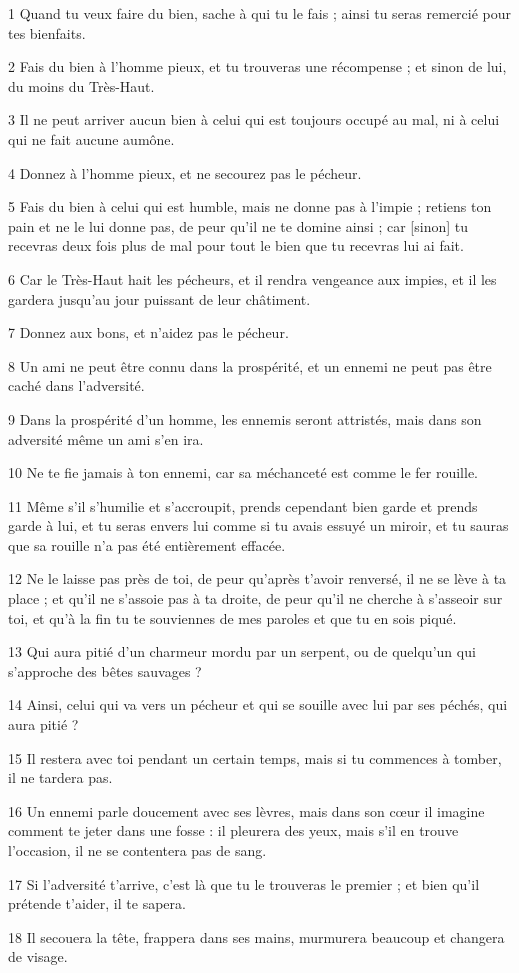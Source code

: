 
\par 1 Quand tu veux faire du bien, sache à qui tu le fais ; ainsi tu seras remercié pour tes bienfaits.
\par 2 Fais du bien à l'homme pieux, et tu trouveras une récompense ; et sinon de lui, du moins du Très-Haut.
\par 3 Il ne peut arriver aucun bien à celui qui est toujours occupé au mal, ni à celui qui ne fait aucune aumône.
\par 4 Donnez à l'homme pieux, et ne secourez pas le pécheur.
\par 5 Fais du bien à celui qui est humble, mais ne donne pas à l'impie ; retiens ton pain et ne le lui donne pas, de peur qu'il ne te domine ainsi ; car [sinon] tu recevras deux fois plus de mal pour tout le bien que tu recevras lui ai fait.
\par 6 Car le Très-Haut hait les pécheurs, et il rendra vengeance aux impies, et il les gardera jusqu'au jour puissant de leur châtiment.
\par 7 Donnez aux bons, et n'aidez pas le pécheur.
\par 8 Un ami ne peut être connu dans la prospérité, et un ennemi ne peut pas être caché dans l'adversité.
\par 9 Dans la prospérité d'un homme, les ennemis seront attristés, mais dans son adversité même un ami s'en ira.
\par 10 Ne te fie jamais à ton ennemi, car sa méchanceté est comme le fer rouille.
\par 11 Même s'il s'humilie et s'accroupit, prends cependant bien garde et prends garde à lui, et tu seras envers lui comme si tu avais essuyé un miroir, et tu sauras que sa rouille n'a pas été entièrement effacée.
\par 12 Ne le laisse pas près de toi, de peur qu'après t'avoir renversé, il ne se lève à ta place ; et qu'il ne s'assoie pas à ta droite, de peur qu'il ne cherche à s'asseoir sur toi, et qu'à la fin tu te souviennes de mes paroles et que tu en sois piqué.
\par 13 Qui aura pitié d'un charmeur mordu par un serpent, ou de quelqu'un qui s'approche des bêtes sauvages ?
\par 14 Ainsi, celui qui va vers un pécheur et qui se souille avec lui par ses péchés, qui aura pitié ?
\par 15 Il restera avec toi pendant un certain temps, mais si tu commences à tomber, il ne tardera pas.
\par 16 Un ennemi parle doucement avec ses lèvres, mais dans son cœur il imagine comment te jeter dans une fosse : il pleurera des yeux, mais s'il en trouve l'occasion, il ne se contentera pas de sang.
\par 17 Si l'adversité t'arrive, c'est là que tu le trouveras le premier ; et bien qu'il prétende t'aider, il te sapera.
\par 18 Il secouera la tête, frappera dans ses mains, murmurera beaucoup et changera de visage.

